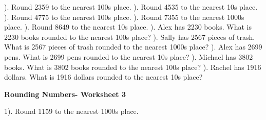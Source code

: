 \documentclass{article}%
\begin{document}
\newline%
\newline%
). Round 2359 to the nearest 100s place.%
\newline%
\newline%
). Round 4535 to the nearest 10s place.%
\newline%
\newline%
). Round 4775 to the nearest 100s place.%
\newline%
\newline%
). Round 7355 to the nearest 1000s place.%
\newline%
\newline%
). Round 8649 to the nearest 10s place.%
\newline%
\newline%
). Alex has 2230 books. What is 2230 books rounded to the nearest 100s place?%
\newline%
\newline%
). Sally has 2567 pieces of trash. What is 2567 pieces of trash rounded to the nearest 1000s place?%
\newline%
\newline%
). Alex has 2699 pens. What is 2699 pens rounded to the nearest 10s place?%
\newline%
\newline%
). Michael has 3802 books. What is 3802 books rounded to the nearest 100s place?%
\newline%
\newline%
). Rachel has 1916 dollars. What is 1916 dollars rounded to the nearest 10s place?%
\newline%
\newline%
\newline%
\pagebreak%
\large%
\begin{center}%
\textbf{Rounding Numbers- Worksheet 3}%
\newline%
\end{center} \normalsize%
1). Round 1159 to the nearest 1000s place.%
\newline%
\end{document}
